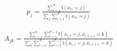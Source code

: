 $$
\begin{align*}
p_j = \frac{\sum_{i=1}^N\mathbb{I}(x_{i1} = j)}{\sum_{j}\sum_{i=1}^N\mathbb{I}(x_{i1} = j)}
\end{align*}
$$

$$
\begin{align*}
A_{jk} = \frac{\sum_{i=1}^N\sum_{t=1}^{T-1} \mathbb{I}(x_{i,t} = j, x_{i,t+1} = k)}{\sum_k\sum_{i=1}^N\sum_{t=1}^{T-1} \mathbb{I}(x_{i,t} = j, x_{i,t+1} = k)}
\end{align*}
$$